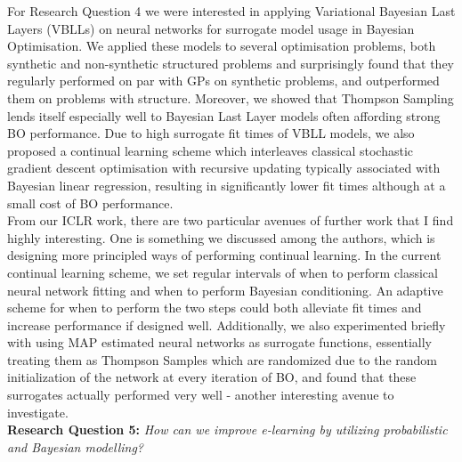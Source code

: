  \noindent For Research Question 4 we were interested in applying Variational Bayesian Last Layers (VBLLs) on neural networks for surrogate model usage in Bayesian Optimisation. We applied these models to several optimisation problems, both synthetic and non-synthetic structured problems and surprisingly found that they regularly performed on par with GPs on synthetic problems, and outperformed them on problems with structure. Moreover, we showed that Thompson Sampling lends itself especially well to Bayesian Last Layer models often affording strong BO performance. Due to high surrogate fit times of VBLL models, we also proposed a continual learning scheme which interleaves classical stochastic gradient descent optimisation with recursive updating typically associated with Bayesian linear regression, resulting in significantly lower fit times although at a small cost of BO performance. \\

 \noindent From our ICLR work, there are two particular avenues of further work that I find highly interesting. One is something we discussed among the authors, which is designing more principled ways of performing continual learning. In the current continual learning scheme, we set regular intervals of when to perform classical neural network fitting and when to perform Bayesian conditioning. An adaptive scheme for when to perform the two steps could both alleviate fit times and increase performance if designed well. Additionally, we also experimented briefly with using MAP estimated neural networks as surrogate functions, essentially treating them as Thompson Samples which are randomized due to the random initialization of the network at every iteration of BO, and found that these surrogates actually performed very well - another interesting avenue to investigate. \\

\noindent \textbf{Research Question 5:} \textit{How can we improve e-learning by utilizing probabilistic and Bayesian modelling?}\\

